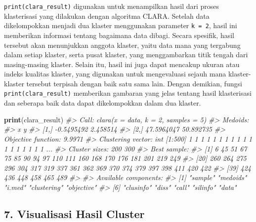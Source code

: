 \documentclass[
  oneside]{book}
\newenvironment{Shaded}{\begin{snugshade}}{\end{snugshade}}
\newcommand{\CommentTok}[1]{\textcolor[rgb]{0.56,0.35,0.01}{\textit{#1}}}
\newcommand{\FunctionTok}[1]{\textcolor[rgb]{0.13,0.29,0.53}{\textbf{#1}}}
\newcommand{\NormalTok}[1]{#1}
\begin{document}
\texttt{print(clara\_result)} digunakan untuk menampilkan hasil dari proses klasterisasi yang dilakukan dengan algoritma CLARA. Setelah data dikelompokkan menjadi dua klaster menggunakan parameter \texttt{k\ =\ 2}, hasil ini memberikan informasi tentang bagaimana data dibagi. Secara spesifik, hasil tersebut akan menunjukkan anggota klaster, yaitu data mana yang tergabung dalam setiap klaster, serta pusat klaster, yang menggambarkan titik tengah dari masing-masing klaster. Selain itu, hasil ini juga dapat mencakup ukuran atau indeks kualitas klaster, yang digunakan untuk mengevaluasi sejauh mana klaster-klaster tersebut terpisah dengan baik satu sama lain. Dengan demikian, fungsi \texttt{print(clara\_result)} memberikan gambaran yang jelas tentang hasil klasterisasi dan seberapa baik data dapat dikelompokkan dalam dua klaster.

\begin{Shaded}
\begin{Highlighting}[]
\FunctionTok{print}\NormalTok{(clara\_result)}
\CommentTok{\#\textgreater{} Call:     clara(x = data, k = 2, samples = 5) }
\CommentTok{\#\textgreater{} Medoids:}
\CommentTok{\#\textgreater{}               x         y}
\CommentTok{\#\textgreater{} [1,] {-}0.5495492  2.458514}
\CommentTok{\#\textgreater{} [2,] 47.5964047 50.892735}
\CommentTok{\#\textgreater{} Objective function:   9.9971}
\CommentTok{\#\textgreater{} Clustering vector:    int [1:500] 1 1 1 1 1 1 1 1 1 1 1 1 1 1 1 1 1 1 ...}
\CommentTok{\#\textgreater{} Cluster sizes:            200 300 }
\CommentTok{\#\textgreater{} Best sample:}
\CommentTok{\#\textgreater{}  [1]   6  45  51  67  75  85  90  94  97 110 111 160 168 170 176 181 201 219 249}
\CommentTok{\#\textgreater{} [20] 260 264 275 296 304 317 319 337 361 362 369 370 374 379 397 398 411 420 422}
\CommentTok{\#\textgreater{} [39] 424 436 448 458 465 489}
\CommentTok{\#\textgreater{} }
\CommentTok{\#\textgreater{} Available components:}
\CommentTok{\#\textgreater{}  [1] "sample"     "medoids"    "i.med"      "clustering" "objective" }
\CommentTok{\#\textgreater{}  [6] "clusinfo"   "diss"       "call"       "silinfo"    "data"}
\end{Highlighting}
\end{Shaded}

\subsection*{7. Visualisasi Hasil Cluster}\label{visualisasi-hasil-cluster}
\end{document}
